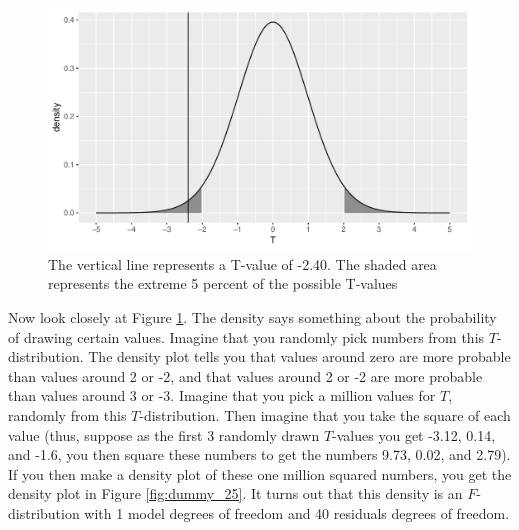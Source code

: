 \documentclass[]{book}\usepackage[]{graphicx}\usepackage[]{color}
\makeatletter
\def\maxwidth{ %
  \ifdim\Gin@nat@width>\linewidth
    \linewidth
  \else
    \Gin@nat@width
  \fi
}
\newenvironment{knitrout}{}{} %
\makeatother
\begin{document}
\begin{knitrout}
\color{fgcolor}\begin{figure}

{\centering \includegraphics[width=\maxwidth]{figure/dummy_24-1} 

}

\caption[The vertical line represents a T-value of -2.40]{The vertical line represents a T-value of -2.40. The shaded area represents the extreme 5 percent of the possible T-values}\label{fig:dummy_24}
\end{figure}


\end{knitrout}


Now look closely at Figure \ref{fig:dummy_24}. The density says something about the probability of drawing certain values. Imagine that you randomly pick numbers from this $T$-distribution. The density plot tells you that values around zero are more probable than values around 2 or -2, and that values around 2 or -2 are more probable than values around 3 or -3. Imagine that you pick a million values for $T$, randomly from this $T$-distribution. Then imagine that you take the square of each value (thus, suppose as the first 3 randomly drawn $T$-values you get -3.12, 0.14, and -1.6, you then square these numbers to get the numbers 9.73, 0.02, and 2.79). If you then make a density plot of these one million squared numbers, you get the density plot in Figure \ref{fig:dummy_25}. It turns out that this density is an $F$-distribution with 1 model degrees of freedom and 40 residuals degrees of freedom. 
\end{document}

